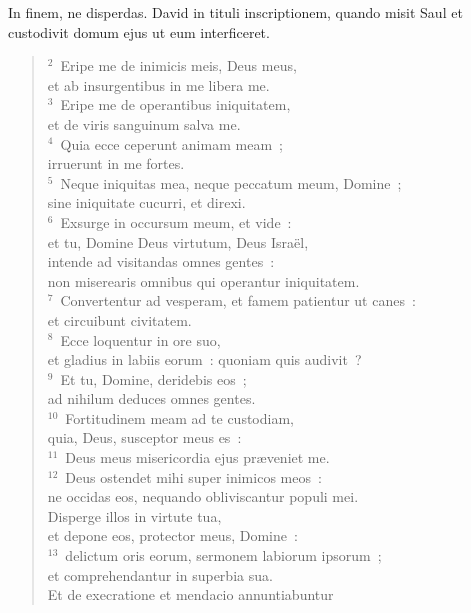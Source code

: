 \bchapter
\lettrine[lines=3,image=true,loversize=0.05,lraise=-0.03]{I}{}n finem, ne disperdas. David in tituli inscriptionem, quando misit Saul et custodivit domum ejus ut eum interficeret.
\begin{flushleft}\begin{verse}\vspace{6pt}${}^{2}$~Eripe me de inimicis meis, Deus meus,\\ et ab insurgentibus in me libera me.\\
${}^{3}$~Eripe me de operantibus iniquitatem,\\ et de viris sanguinum salva me.\\
${}^{4}$~Quia ecce ceperunt animam meam~;\\ irruerunt in me fortes.\\
${}^{5}$~Neque iniquitas mea, neque peccatum meum, Domine~;\\ sine iniquitate cucurri, et direxi.\\
${}^{6}$~Exsurge in occursum meum, et vide~:\\ et tu, Domine Deus virtutum, Deus Isra\"el,\\ intende ad visitandas omnes gentes~:\\ non miserearis omnibus qui operantur iniquitatem.\\
${}^{7}$~Convertentur ad vesperam, et famem patientur ut canes~:\\ et circuibunt civitatem.\\
${}^{8}$~Ecce loquentur in ore suo,\\ et gladius in labiis eorum~: quoniam quis audivit~?\\
${}^{9}$~Et tu, Domine, deridebis eos~;\\ ad nihilum deduces omnes gentes.\\
${}^{10}$~Fortitudinem meam ad te custodiam,\\ quia, Deus, susceptor meus es~:\\
${}^{11}$~Deus meus misericordia ejus pr\ae veniet me.\\
${}^{12}$~Deus ostendet mihi super inimicos meos~:\\ ne occidas eos, nequando obliviscantur populi mei.\\ Disperge illos in virtute tua,\\ et depone eos, protector meus, Domine~:\\
${}^{13}$~delictum oris eorum, sermonem labiorum ipsorum~;\\ et comprehendantur in superbia sua.\\ Et de execratione et mendacio annuntiabuntur

\end{verse}
\end{flushleft}
